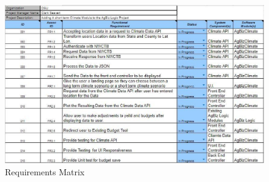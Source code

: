 \documentclass[onecolumn, draftclsnofoot,10pt, compsoc]{article}
\begin{document}
		\begin{figure}[htb]
			\begin{center}
				\includegraphics[width=500pt]{Figures/RequirementsMatrix.eps}
			\end{center}
			\caption{Requirements Matrix}
			\label{fig:ReqMat}
		\end{figure}
\end{document}
